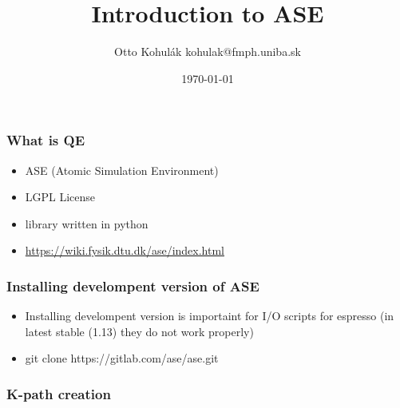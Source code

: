 \documentclass{beamer}
\begin{document}
\title{Introduction to ASE}   
\author{Otto Kohul\'{a}k \newline kohulak@fmph.uniba.sk} 
\date{\today} 

\frame{\titlepage} 

\begin{frame}
  \frametitle{What is QE}
  \begin{itemize}
    \item ASE (Atomic Simulation Environment)
    \item LGPL License
    \item library written in python
    \item \url{https://wiki.fysik.dtu.dk/ase/index.html}
  \end{itemize}
\end{frame}

\begin{frame}
  \frametitle{Installing develompent version of ASE}
  \begin{itemize}
    \item Installing develompent version is importaint for I/O scripts for espresso (in latest stable (1.13) they do not work properly)
    \item git clone https://gitlab.com/ase/ase.git
  \end{itemize}
\end{frame}

\begin{frame}
  \frametitle{K-path creation}
  
\end{frame}
\end{document}
